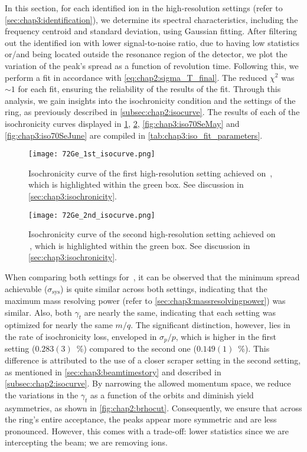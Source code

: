 In this section, for each identified ion in the high-resolution settings (refer to \cref{sec:chap3:identification}), we determine its spectral characteristics, including the frequency centroid and standard deviation, using Gaussian fitting. After filtering out the identified ion with lower signal-to-noise ratio, due to having low statistics or/and being located outside the resonance region of the detector, we plot the variation of the peak's spread as a function of revolution time. Following this, we perform a fit in accordance with \cref{eq:chap2:sigma_T_final}. The reduced $\chi^2$ was $\sim1$ for each fit, ensuring the reliability of the results of the fit. Through this analysis, we gain insights into the isochronicity condition and the settings of the ring, as previously described in \cref{subsec:chap2:isocurve}. The results of each of the isochronicity curves displayed in \cref{fig:chap3:iso72Ge1}, \cref{fig:chap3:iso72Ge2}, \cref{fig:chap3:iso70SeMay} and \cref{fig:chap3:iso70SeJune} are compiled in \cref{tab:chap3:iso_fit_parameters}.

\begin{figure}[hbt]
  \centering
  \texttt{[image: 72Ge\_1st\_isocurve.png]}
  \caption{Isochronicity curve of the first high-resolution setting achieved on \,, which is highlighted within the green box. See discussion in \cref{sec:chap3:isochronicity}.}
  \label{fig:chap3:iso72Ge1}
  \end{figure}
  
  \begin{figure}[hbt]
  \centering
  \texttt{[image: 72Ge\_2nd\_isocurve.png]}
  \caption{Isochronicity curve of the second high-resolution setting achieved on \,, which is highlighted within the green box. See discussion in \cref{sec:chap3:isochronicity}.}
  \label{fig:chap3:iso72Ge2}
  \end{figure}

When comparing both settings for \,, it can be observed that the minimum spread achievable ($\sigma_{\mathrm{sys}}$) is quite similar across both settings, indicating that the maximum mass resolving power (refer to \cref{sec:chap3:massresolvingpower}) was similar. Also, both $\gamma_t$ are nearly the same, indicating that each setting was optimized for nearly the same $m/q$. The significant distinction, however, lies in the rate of isochronicity loss, enveloped in $\sigma_p / p$, which is higher in the first setting ($ 0.283(3)$~\%) compared to the second one ($ 0.149(1)$~\%). This difference is attributed to the use of a closer scraper setting in the second setting, as mentioned in \cref{sec:chap3:beamtimestory} and described in \cref{subsec:chap2:isocurve}. 
By narrowing the allowed momentum space, we reduce the variations in the $\gamma_t$ as a function of the orbits and diminish yield asymmetries, as shown in \cref{fig:chap2:brhocut}. Consequently, we ensure that across the ring's entire acceptance, the peaks appear more symmetric and are less pronounced. However, this comes with a trade-off: lower statistics since we are intercepting the beam; we are removing ions.


